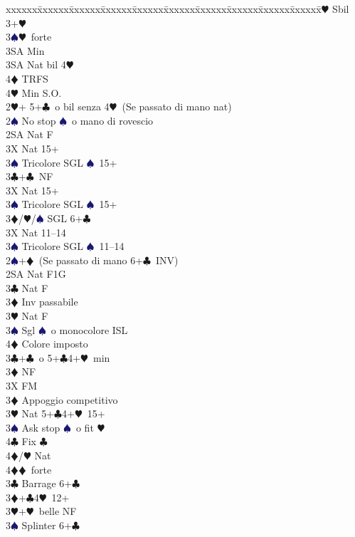 \documentclass[a4paper,italian]{article}
\newcommand{\BC}{\textcolor{OliveGreen}{$\clubsuit$}}
\newcommand{\BD}{\textcolor{RedOrange}{$\vardiamondsuit$}}
\newcommand{\BH}{\textcolor{Red2}{$\varheartsuit${}}}
\newcommand{\BS}{\textcolor{MidnightBlue}{$\spadesuit${}}}
\newenvironment{bidtable}
{\begin{tabbing}

    xxxxxx\=xxxxxx\=xxxxxx\=xxxxxx\=xxxxxx\=xxxxxx\=xxxxxx\=xxxxxx\=xxxxxx\=xxxxxx\=\kill}
{\end{tabbing} }%
\begin{document}
\begin{multicols}{2}
\begin{bidtable}
        3\BH \> Sbil 3+\BH \\
        3\BS {}\BH\ forte\+\\
        3SA \> Min\-\\
        3SA \> Nat bil 4\BH \+\\
        4\BD \> TRFS\-\\
        4\BH \> Min S.O.\-\\
        2\BH {}+ 5+\BC\ o bil senza 4\BH\ (Se passato di mano nat)\+\\
        2\BS \> No stop \BS\ o mano di rovescio\+\\
        2SA \> Nat F\+\\
        3X \> Nat 15+\\
        3\BS \> Tricolore SGL \BS\ 15+\-\\
        3\BC {}+\BC\ NF\+\\
        3X \> Nat 15+\\
        3\BS \> Tricolore SGL \BS\ 15+\-\\
        3\BD/\BH/\BS \> SGL 6+\BC \-\\
        3X \> Nat 11--14\\
        3\BS \> Tricolore SGL \BS\  11--14\-\\
        2\BS {}+\BD\ (Se passato di mano 6+\BC\ INV)\+\\
        2SA \> Nat F1G\+\\
        3\BC \> Nat F\\
        3\BD \> Inv passabile\\
        3\BH \> Nat F\\
        3\BS \> Sgl \BS\ o monocolore ISL\\
        4\BD \> Colore imposto\-\\
        3\BC {}+\BC\ o 5+\BC 4+\BH\ min\+\\
        3\BD \> NF\\
        3X \> FM\-\\
        3\BD \> Appoggio competitivo\\
        3\BH \> Nat 5+\BC 4+\BH\ 15+\+\\
        3\BS \> Ask stop \BS\ o fit \BH \\
        4\BC \> Fix \BC \\
        4\BD/\BH \> Nat\-\\
        4\BD {}\BD\ forte\-\\
        3\BC \> Barrage 6+\BC \\
        3\BD {}+\BC 4\BH\ 12+\\
        3\BH {}+\BH\ belle NF\\
        3\BS \> Splinter 6+\BC \-
    \end{bidtable}


\end{multicols}
\end{document}

